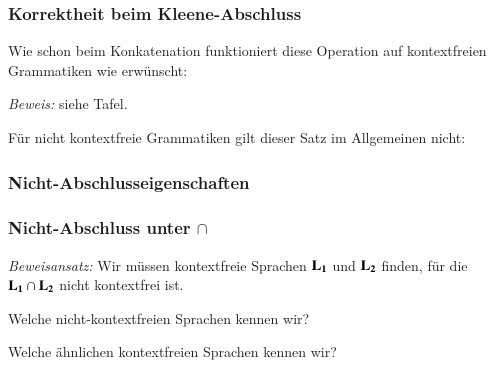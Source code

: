 \documentclass[onlymath]{beamer}
\begin{document}
\begin{frame}\frametitle{Korrektheit beim Kleene-Abschluss}

Wie schon beim Konkatenation funktioniert diese Operation auf kontextfreien Grammatiken wie
erwünscht:


\emph{Beweis:} siehe Tafel.
\medskip\pause

Für nicht kontextfreie Grammatiken gilt dieser Satz im Allgemeinen nicht:


\end{frame}

\begin{frame}\frametitle{Nicht-Abschlusseigenschaften}


\end{frame}

\begin{frame}\frametitle{Nicht-Abschluss unter $\cap$}

\emph{Beweisansatz:} Wir müssen kontextfreie Sprachen $\textbf{\textcolor{black}{L}}_{\textbf{\textcolor{black}{1}}}$ und $\textbf{\textcolor{black}{L}}_{\textbf{\textcolor{black}{2}}}$ finden, für die
$\textbf{\textcolor{black}{L}}_{\textbf{\textcolor{black}{1}}}\cap\textbf{\textcolor{black}{L}}_{\textbf{\textcolor{black}{2}}}$ nicht kontextfrei ist.\medskip

\alert{Welche nicht-kontextfreien Sprachen kennen wir?}\pause
\medskip

\bigskip\pause

\alert{Welche ähnlichen kontextfreien Sprachen kennen wir?}\pause
\medskip


\end{frame}
\end{document}
